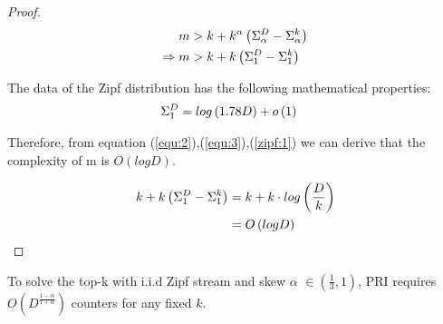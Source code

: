 \begin{proof}
\begin{equation}
\begin{aligned}
\centering  
    m &> k + k^\alpha \left(\Sigma_\alpha^D-\Sigma_\alpha^k\right)\\
    \Rightarrow m &> k + k\left(\Sigma_1^D-\Sigma_1^k\right)
\end{aligned}
\end{equation}

The data of the Zipf distribution has the following mathematical properties:\\
\begin{equation}
\begin{aligned}
\centering
    \Sigma_1^D &= log\left(1.78D\right) + o\left(1\right)
\label{zipf:1}
\end{aligned}
\end{equation}

Therefore, from equation (\ref{equ:2}),(\ref{equ:3}),(\ref{zipf:1}) we can derive that the complexity of m is $O(logD)$.

\begin{equation}
\begin{aligned}
\centering
\label{equ:4}
k + k\left(\Sigma_1^D-\Sigma_1^k\right) &= k + k \cdot log\left(\frac{D}{k}\right)\\
&= O\left(logD\right)
\end{aligned}
\end{equation}

\end{proof}

\begin{theorem}
	To solve the top-k with i.i.d Zipf stream and skew $\alpha$ $\in(\frac{1}{3},1)$, PRI requires $O(D^\frac{1-\alpha}{1+\alpha})$ counters for any fixed $k$.
\end{theorem}

